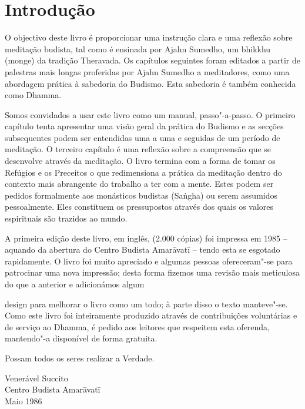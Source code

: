 \chapter{Introdução}

O objectivo deste livro é proporcionar uma instrução clara e uma
reflexão sobre meditação budista, tal como é ensinada por Ajahn Sumedho,
um bhikkhu (monge) da tradição Theravada. Os capítulos seguintes foram
editados a partir de palestras mais longas proferidas por Ajahn Sumedho
a meditadores, como uma abordagem prática à sabedoria do Budismo. Esta
sabedoria é também conhecida como Dhamma.

Somos convidados a usar este livro como um manual, passo"-a-passo.
O primeiro capítulo tenta apresentar uma visão geral da
prática do Budismo e as secções subsequentes podem ser entendidas uma a
uma e seguidas de um período de meditação. O terceiro capítulo é uma
reflexão sobre a compreensão que se desenvolve através da meditação. O
livro termina com a forma de tomar os Refúgios e os Preceitos o que
redimensiona a prática da meditação dentro do contexto mais abrangente
do trabalho a ter com a mente. Estes podem ser pedidos formalmente aos
monásticos budistas (Saṅgha) ou serem assumidos pessoalmente. Eles
constituem os pressupostos através dos quais os valores espirituais são
trazidos ao mundo.

A primeira edição deste livro, em inglês, (2.000 cópias) foi impressa em
1985 -- aquando da abertura do Centro Budista Amarāvatī -- tendo esta se
esgotado rapidamente. O livro foi muito apreciado e algumas pessoas
ofereceram"-se para patrocinar uma nova impressão; desta forma fizemos
uma revisão mais meticulosa do que a anterior e adicionámos algum

design para melhorar o livro como um todo; à parte disso o texto
manteve"-se. Como este livro foi inteiramente produzido através de
contribuições voluntárias e de serviço ao Dhamma, é pedido aos leitores
que respeitem esta oferenda, mantendo"-a disponível de forma gratuita.

Possam todos os seres realizar a Verdade.

\bigskip

{\raggedleft
Venerável Succito\\
Centro Budista Amarāvatī\\
Maio 1986
\par}


